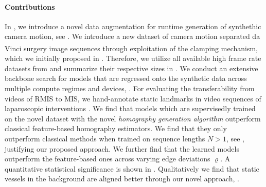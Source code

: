 \paragraph{Contributions} In , we introduce a novel data augmentation  for runtime generation of synthethic camera motion, see . We introduce a new dataset of camera motion separated da Vinci\textsuperscript{\textregistered} surgery image sequences through exploitation of the clamping mechanism, which we initially proposed in . Therefore, we utilize all available high frame rate datasets from  and summarize their respective sizes in . We conduct an extensive backbone search for models that are regressed onto the synthetic data across multiple compute regimes and devices, . For evaluating the transferability from videos of RMIS to MIS, we hand-annotate static landmarks in video sequences of laparoscopic interventions . We find that models which are supervisedly trained on the novel dataset with the novel \textit{homography generation algorithm} outperform classical feature-based homography estimators. We find that they only outperform classical methods when trained on sequence lengths $N>1$, see , justifying our proposed approach. We further find that the learned models outperform the feature-based ones across varying edge deviations $\varrho$. A quantitative statistical significance is shown in . Qualitatively we find that static vessels in the background are aligned better through our novel approach, .


